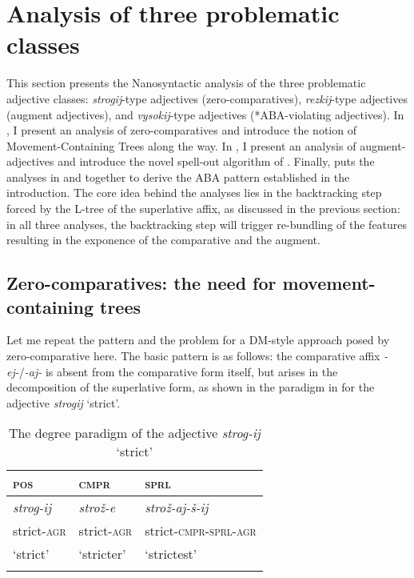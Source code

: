\documentclass[output=paper,colorlinks,citecolor=brown]{langscibook}
\begin{document}
\clearpage

\section{Analysis of three problematic classes}\label{kas:sec:analysis}

This section presents the Nanosyntactic analysis of the three problematic adjective classes: \textit{strogij}-type adjectives (zero-comparatives), \textit{rezkij}-type adjectives (augment adjectives), and \textit{vysokij}-type adjectives ({*}ABA-violating adjectives). In , I present an analysis of zero-comparatives and introduce the notion of Mo\-ve\-ment-Con\-taining Trees \citep{Blix:2022} along the way. In , I present an analysis of augment-adjectives and introduce the novel spell-out algorithm of \citet{Caha:2022b,Caha:2023}. Finally,  puts the analyses in  and  together to derive the ABA pattern established in the introduction. The core idea behind the analyses lies in the backtracking step forced by the L-tree of the superlative affix, as discussed in the previous section: in all three analyses, the backtracking step will trigger re-bundling of the features resulting in the exponence of the comparative and the augment.

\subsection{Zero-comparatives: the need for movement-containing trees}\label{kas:subsec:zero}

Let me repeat the pattern and the problem for a DM-style approach posed by zero-comparative here. The basic pattern is as follows: the comparative affix \textit{-ej-}/\textit{-aj-} is absent from the comparative form itself, but arises in the decomposition of the superlative form, as shown in the paradigm in  for the adjective \textit{strogij} `strict'.

\begin{table}
\caption{The degree paradigm of the adjective \textit{strog-ij} `strict'}
\label{kas:tab:strict:paradigm:repeat}
 \begin{tabularx}{.8\textwidth}{QQl}
  \lsptoprule
        \textsc{pos}   &\textsc{cmpr}  & \textsc{sprl} \\
  \midrule
        \textit{strog-ij} &\textit{strož-e} &\textit{strož-aj-š-ij} \\
        {strict-\textsc{agr}} & {strict-\textsc{agr}} & {strict-\textsc{cmpr-sprl-agr}}  \\
        {`strict'} & {`stricter'} & {`strictest'}\\
  \lspbottomrule
 \end{tabularx}
\end{table}
\end{document}
